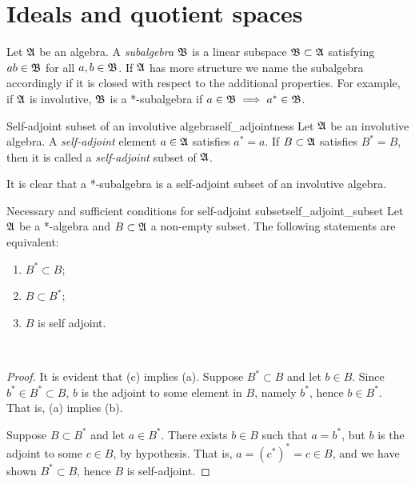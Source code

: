 \section{Ideals and quotient spaces}
Let \(\mathfrak{A}\) be an algebra. A \emph{subalgebra} \(\mathfrak{B}\) is a linear subspace \(\mathfrak{B} \subset \mathfrak{A}\) satisfying \(ab \in \mathfrak{B}\) for all \(a, b \in \mathfrak{B}\). If \(\mathfrak{A}\) has more structure we name the subalgebra accordingly if it is closed with respect to the additional properties. For example, if \(\mathfrak{A}\) is involutive, \(\mathfrak{B}\) is a *-subalgebra if \(a \in \mathfrak{B} \implies a^* \in \mathfrak{B}\).
\begin{definition}{Self-adjoint subset of an involutive algebra}{self_adjointness}
    Let \(\mathfrak{A}\) be an involutive algebra. A \emph{self-adjoint} element \(a \in \mathfrak{A}\) satisfies \(a^* = a\). If \(B \subset \mathfrak{A}\) satisfies \(B^* = B\), then it is called a \emph{self-adjoint} subset of \(\mathfrak{A}\).
\end{definition}
\begin{remark}
    It is clear that a *-subalgebra is a self-adjoint subset of an involutive algebra.
\end{remark}
\begin{proposition}{Necessary and sufficient conditions for self-adjoint subset}{self_adjoint_subset}
    Let \(\mathfrak{A}\) be a *-algebra and \(B \subset \mathfrak{A}\) a non-empty subset. The following statements are equivalent:
    \begin{enumerate}[label=(\alph*)]
        \item \(B^* \subset B\);
        \item \(B \subset B^*\);
        \item \(B\) is self adjoint.
    \end{enumerate}\
\end{proposition}
\begin{proof}
    It is evident that (c) implies (a). Suppose \(B^* \subset B\) and let \(b \in B\). Since \(b^* \in B^* \subset B\), \(b\) is the adjoint to some element in \(B\), namely \(b^*\), hence \(b \in B^*\).  That is, (a) implies (b).

    Suppose \(B \subset B^*\) and let \(a \in B^*\). There exists \(b \in B\) such that \(a = b^*\), but \(b\) is the adjoint to some \(c \in B\), by hypothesis. That is, \(a = (c^*)^* = c \in B\), and we have shown \(B^* \subset B\), hence \(B\) is self-adjoint.
\end{proof}

